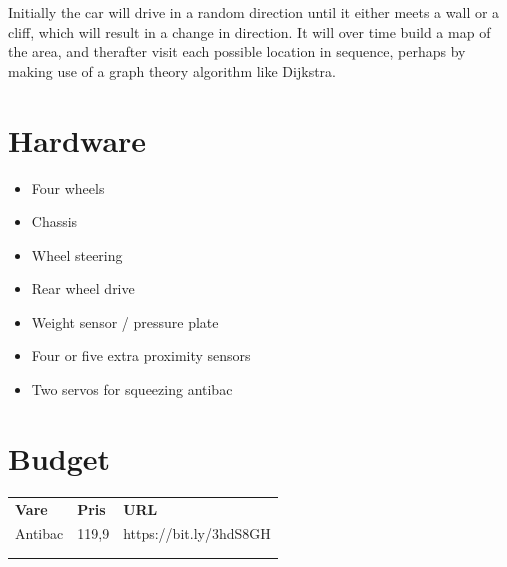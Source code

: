 \documentclass{article}
\begin{document}
	Initially the car will drive in a random direction until it either meets a wall or a cliff, which will result in a change in direction. It will over time build a map of the area, and therafter visit each possible location in sequence, perhaps by making use of a graph theory algorithm like Dijkstra.


\section{Hardware}
	\begin{itemize}
		\item{Four wheels}
		\item{Chassis}
		\item{Wheel steering}
		\item{Rear wheel drive}
		\item{Weight sensor / pressure plate}
		\item{Four or five extra proximity sensors}
		\item{Two servos for squeezing antibac}
	\end{itemize}
\section{Budget}
\begin{table}[H]
\begin{tabular}{lll}
\textbf{Vare} & \textbf{Pris} & \textbf{URL}      \\
Antibac       & 119,9         & https://bit.ly/3hdS8GH \\
              &               &                   \\
              &               &                  
\end{tabular}
\end{table}
\end{document}

